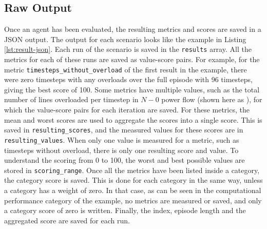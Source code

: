 \subsection{Raw Output}\label{ssec:raw-output}
Once an agent has been evaluated, the resulting metrics and scores are saved in a JSON output. The output for each scenario looks like the example in Listing \ref{lst:result-json}. Each run of the scenario is saved in the \texttt{results} array. All the metrics for each of these runs are saved as value-score pairs. For example, for the metric \texttt{timesteps\_without\_overload} of the first result in the example, there were zero timesteps with any overloads over the full episode with 96 timesteps, giving the best score of 100. Some metrics have multiple values, such as the total number of lines overloaded per timestep in $N-0$ power flow (shown here as \texttt{}), for which the value-score pairs for each iteration are saved. For these metrics, the mean and worst scores are used to aggregate the scores into a single score. This is saved in \texttt{resulting\_scores}, and the measured values for these scores are in \texttt{resulting\_values}. When only one value is measured for a metric, such as timesteps without overload, there is only one resulting score and value. To understand the scoring from 0 to 100, the worst and best possible values are stored in \texttt{scoring\_range}.
Once all the metrics have been listed inside a category, the category score is saved. This is done for each category in the same way, unless a category has a weight of zero. In that case, as can be seen in the computational performance category of the example, no metrics are measured or saved, and only a category score of zero is written. Finally, the index, episode length and the aggregated score are saved for each run.

